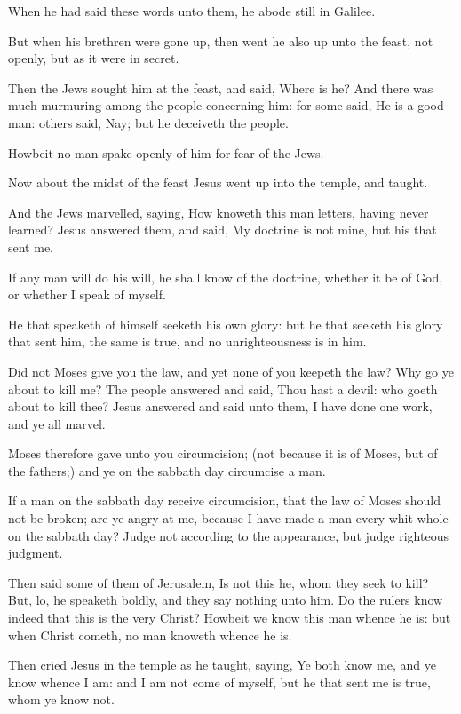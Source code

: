 \Verse When he had said these words unto them, he abode still in Galilee.

\Verse But when his brethren were gone up, then went he also up unto the feast, not openly, but as it were in secret.

\Verse Then the Jews sought him at the feast, and said, Where is he?  \Verse And there was much murmuring among the people concerning him: for some said, He is a good man: others said, Nay; but he deceiveth the people.

\Verse Howbeit no man spake openly of him for fear of the Jews.

\Verse Now about the midst of the feast Jesus went up into the temple, and taught.

\Verse And the Jews marvelled, saying, How knoweth this man letters, having never learned?  \Verse Jesus answered them, and said, My doctrine is not mine, but his that sent me.

\Verse If any man will do his will, he shall know of the doctrine, whether it be of God, or whether I speak of myself.

\Verse He that speaketh of himself seeketh his own glory: but he that seeketh his glory that sent him, the same is true, and no unrighteousness is in him.

\Verse Did not Moses give you the law, and yet none of you keepeth the law?  Why go ye about to kill me?  \Verse The people answered and said, Thou hast a devil: who goeth about to kill thee?  \Verse Jesus answered and said unto them, I have done one work, and ye all marvel.

\Verse Moses therefore gave unto you circumcision; (not because it is of Moses, but of the fathers;) and ye on the sabbath day circumcise a man.

\Verse If a man on the sabbath day receive circumcision, that the law of Moses should not be broken; are ye angry at me, because I have made a man every whit whole on the sabbath day?  \Verse Judge not according to the appearance, but judge righteous judgment.

\Verse Then said some of them of Jerusalem, Is not this he, whom they seek to kill?  \Verse But, lo, he speaketh boldly, and they say nothing unto him. Do the rulers know indeed that this is the very Christ?  \Verse Howbeit we know this man whence he is: but when Christ cometh, no man knoweth whence he is.

\Verse Then cried Jesus in the temple as he taught, saying, Ye both know me, and ye know whence I am: and I am not come of myself, but he that sent me is true, whom ye know not.

